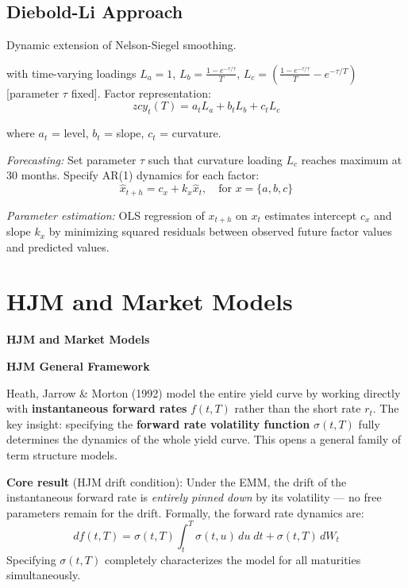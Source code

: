 \documentclass[12pt,a4paper]{article}
\begin{document}
\subsection{Diebold-Li Approach}

Dynamic extension of Nelson-Siegel smoothing.

with time-varying loadings $L_a = 1$, $L_b = \frac{1-e^{-\tau/\tau}}{T}$, $L_c = \left(\frac{1-e^{-\tau/\tau}}{T} - e^{-\tau/T}\right)$ [parameter $\tau$ fixed]. Factor representation:
$$zcy_t(T) = a_t L_a + b_t L_b + c_t L_c$$

where $a_t$ = level, $b_t$ = slope, $c_t$ = curvature.

\textit{Forecasting:} Set parameter $\tau$ such that curvature loading $L_c$ reaches maximum at 30 months. Specify AR(1) dynamics for each factor:
$$\hat{x}_{t+h} = c_x + k_x\hat{x}_t, \quad \text{for } x = \{a, b, c\}$$

\textit{Parameter estimation:} OLS regression of $x_{t+h}$ on $x_t$ estimates intercept $c_x$ and slope $k_x$ by minimizing squared residuals between observed future factor values and predicted values.

\section{HJM and Market Models}







\noindent\textbf{\large HJM and Market Models}
\vspace{0.5em}

\noindent\textbf{HJM General Framework}

\vspace{0.3em}
\noindent Heath, Jarrow \& Morton (1992) model the entire yield curve by working directly with \textbf{instantaneous forward rates} $f(t,T)$ rather than the short rate $r_t$. The key insight: specifying the \textbf{forward rate volatility function} $\sigma(t,T)$ fully determines the dynamics of the whole yield curve. This opens a general family of term structure models.

\vspace{0.3em}
\noindent\textbf{Core result} (HJM drift condition): Under the EMM, the drift of the instantaneous forward rate is \emph{entirely pinned down} by its volatility — no free parameters remain for the drift. Formally, the forward rate dynamics are:
\[
df(t,T) = \sigma(t,T)\int_t^T \sigma(t,u)\,du\; dt + \sigma(t,T)\,dW_t
\]
Specifying $\sigma(t,T)$ completely characterizes the model for all maturities simultaneously.
\end{document}
